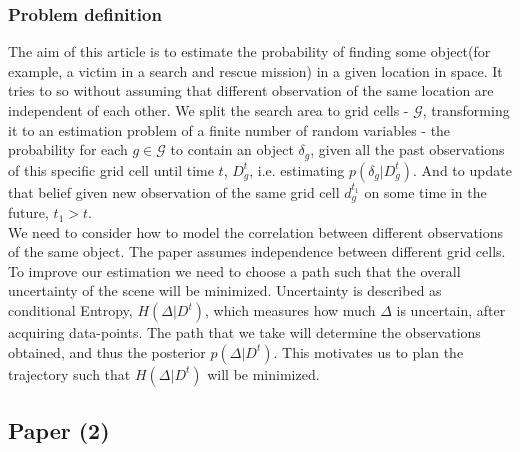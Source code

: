 \documentclass{article}
\begin{document}
	\subsubsection{Problem definition}
	The aim of this article is to estimate the probability of finding some object(for example, a victim in a search and rescue mission) in a given location in space. It tries to so without assuming that different observation of the same location are independent of each other. We split the search area to grid cells - $\mathcal{G}$, transforming it to an estimation problem of a finite number of random variables - the probability for each $g \in \mathcal{G}$ to contain an object $\delta_g$, given all the past observations of this specific grid cell until time $t$, $D_g^t$, i.e. estimating $p(\delta_g|D_g^t)$. And to update that belief given new observation of the same grid cell $d_g^{t_1}$ on some time in the future, $t_1>t$. \\
	
	We need to consider how to model the correlation between different observations of the same object. The paper assumes independence between different grid cells.
	To improve our estimation we need to choose a path such that the overall uncertainty of the scene will be minimized.
	Uncertainty is described as conditional Entropy, $H(\Delta|D^t)$, which measures how much $\Delta$ is uncertain, after acquiring data-points. The path that we take will determine the observations obtained, and thus the posterior $p(\Delta|D^t)$. This motivates us to plan the trajectory such that $H(\Delta|D^t)$ will be minimized.
	
	\subsection{Paper (2)}
\end{document}
